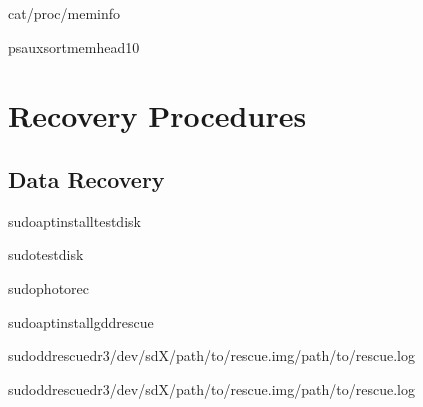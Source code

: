 \documentclass[letterpaper,10pt,english]{sphinxmanual}
\begin{document}
\sphinxAtStartPar
{}

\begin{sphinxVerbatim}[commandchars=\\\{\}]
cat/proc/meminfo

psaux\PYGZhy{}\PYGZhy{}sort\PYGZhy{}\PYGZpc{}memhead\PYGZhy{}10
\end{sphinxVerbatim}


\section{Recovery Procedures}
\label{\detokenize{troubleshooting:recovery-procedures}}

\subsection{Data Recovery}
\label{\detokenize{troubleshooting:data-recovery}}
\sphinxAtStartPar
{}

\begin{sphinxVerbatim}[commandchars=\\\{\}]
sudoaptinstalltestdisk

sudotestdisk

sudophotorec
\end{sphinxVerbatim}

\sphinxAtStartPar
{}

\begin{sphinxVerbatim}[commandchars=\\\{\}]
sudoaptinstallgddrescue

sudoddrescue\PYGZhy{}d\PYGZhy{}r3/dev/sdX/path/to/rescue.img/path/to/rescue.log

sudoddrescue\PYGZhy{}d\PYGZhy{}r3/dev/sdX/path/to/rescue.img/path/to/rescue.log
\end{sphinxVerbatim}
\end{document}
